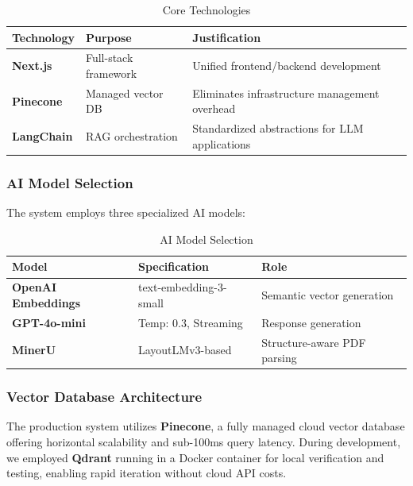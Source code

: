 \documentclass[conference]{IEEEtran}
\begin{document}
\begin{table}[htbp]
\caption{Core Technologies}
\begin{center}
\begin{tabular}{|l|l|p{2.5cm}|}
\hline
\textbf{Technology} & \textbf{Purpose} & \textbf{Justification} \\
\hline
\textbf{Next.js} & Full-stack framework & Unified frontend/backend development \\
\hline
\textbf{Pinecone} & Managed vector DB & Eliminates infrastructure management overhead \\
\hline
\textbf{LangChain} & RAG orchestration & Standardized abstractions for LLM applications \\
\hline
\end{tabular}
\label{tab:tech}
\end{center}
\end{table}

\subsubsection{AI Model Selection}
The system employs three specialized AI models:

\begin{table}[htbp]
\caption{AI Model Selection}
\begin{center}
\begin{tabular}{|l|l|l|}
\hline
\textbf{Model} & \textbf{Specification} & \textbf{Role} \\
\hline
\textbf{OpenAI Embeddings} & text-embedding-3-small & Semantic vector generation \\
\hline
\textbf{GPT-4o-mini} & Temp: 0.3, Streaming & Response generation \\
\hline
\textbf{MinerU} & LayoutLMv3-based & Structure-aware PDF parsing \\
\hline
\end{tabular}
\label{tab:models}
\end{center}
\end{table}

\subsubsection{Vector Database Architecture}
The production system utilizes \textbf{Pinecone}, a fully managed cloud vector database offering horizontal scalability and sub-100ms query latency. During development, we employed \textbf{Qdrant} running in a Docker container for local verification and testing, enabling rapid iteration without cloud API costs.
\end{document}
